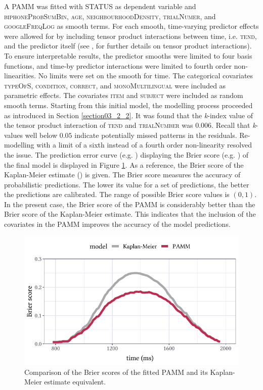 A PAMM was fitted with STATUS as dependent variable and \textsc{biphoneProbSumBin}, \textsc{age}, \textsc{neighbourhoodDensity}, \textsc{trialNumer}, and \textsc{googleFreqLog} as smooth terms. For each smooth, time-varying predictor effects were allowed for by including tensor product interactions between time, i.e. \textsc{tend}, and the predictor itself (see \cite{Wood2017}, for further details on tensor product interactions). To ensure interpretable results, the predictor smooths were limited to four basis functions, and time-by predictor interactions were limited to fourth order non-linearities. No limits were set on the smooth for time. The categorical covariates \textsc{typeOfS}, \textsc{condition}, \textsc{correct}, and \textsc{monoMultilingual} were included as parametric effects. The covariates \textsc{item} and \textsc{subject} were included as random smooth terms. Starting from this initial model, the modelling process proceeded as introduced in Section \ref{section03_2_2}. It was found that the \textit{k}-index value of the tensor product interaction of \textsc{tend} and \textsc{trialNumber} was $0.006$. Recall that \textit{k}-values well below $0.05$ indicate potentially missed patterns in the residuals. Re-modelling with a limit of a sixth instead of a fourth order non-linearity resolved the issue. The prediction error curve (e.g. \cite{Mogensen2012}) displaying the Brier score (e.g. \cite{Brier1950, Gerds2006, Bradley2008}) of the final model is displayed in Figure \ref{fig:7_2}. As a reference, the Brier score of the Kaplan-Meier estimate (\cite{Kaplan1958}) is given. The Brier score measures the accuracy of probabilistic predictions. The lower its value for a set of predictions, the better the predictions are calibrated. The range of possible Brier score values is $(0,1)$. In the present case, the Brier score of the PAMM is considerably better than the Brier score of the Kaplan-Meier estimate. This indicates that the inclusion of the covariates in the PAMM improves the accuracy of the model predictions. 

\begin{figure}
    \centering
    \includegraphics[]{figures/fig7.2.pdf}
    \caption{Comparison of the Brier scores of the fitted PAMM and its Kaplan-Meier estimate equivalent.}
    \label{fig:7_2}
\end{figure}

